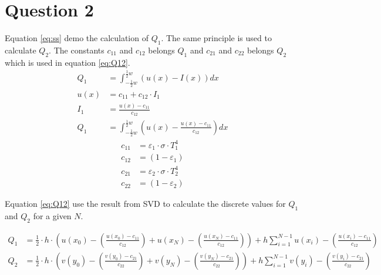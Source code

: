 \newpage
\section*{Question 2}

Equation \ref{eq:ss} demo the calculation of \( Q_1 \). The same principle is used to calculate \( Q_2 \). 
The constants \( c_{11} \) and \( c_{12} \) belongs \( Q_1 \) and \( c_{21} \) and \( c_{22} \) belongs \( Q_2 \) which is used in equation \ref{eq:Q12}.\\

\begin{equation}
\begin{align*}
Q_{ 1 }&=\int _{ -\frac { 1 }{ 2 } w }^{ \frac { 1 }{ 2 } w } \left( { u }\left( x \right) -I\left( x \right)  \right) { dx }\\ 
u\left( x \right) &={ c }_{ 11 }+{ c }_{ 12 }\cdot I_{ 1 }\\ 
{ I }_{ 1 }&=\frac { u\left( x \right) -{ c }_{ 11 } }{ { c }_{ 12 } } \\ 
Q_{ 1 }&=\int _{ -\frac { 1 }{ 2 } w }^{ \frac { 1 }{ 2 } w } \left( { u }\left( x \right) -\frac { u\left( x \right) -{ c }_{ 11 } }{ { c }_{ 12 } }  \right) { dx }
\end{align*}
\label{eq:ss}
\end{equation}
\begin{equation}
\begin{align*}
{ c }_{ 11 }&={ \varepsilon  }_{ 1 }\cdot \sigma \cdot { T }_{ 1 }^{ 4 }\\ 
{ c }_{ 12 }&=\left( 1-{ \varepsilon  }_{ 1 } \right) \\ 
{ c }_{ 21 }&={ \varepsilon  }_{ 2 }\cdot \sigma \cdot { T }_{ 2 }^{ 4 }\\ 
{ c }_{ 22 }&=\left( 1-{ \varepsilon  }_{ 2 } \right) 
\end{align*}
\label{eq:ad}
\end{equation}

Equation \ref{eq:Q12} use the result from SVD to calculate the discrete values for \( Q_1 \) and \( Q_2 \) for a given \( N \).

\begin{equation}
\begin{align*}
{ Q }_{ 1 }&=\frac { 1 }{ 2 } \cdot h\cdot \left( u\left( { x }_{ 0 } \right) -\left( \frac { u\left( { x }_{ 0 } \right) -{ c }_{ 11 } }{ { c }_{ 12 } }  \right) +u\left( { x }_{ N } \right) -\left( \frac { u\left( { x }_{ N } \right) -{ c }_{ 11 } }{ { c }_{ 12 } }  \right)  \right) +h\sum _{ i=1 }^{ N-1 }{ u\left( { x }_{ i } \right) - } \left( \frac { u\left( { x }_{ i } \right) -{ c }_{ 11 } }{ { c }_{ 12 } }  \right) \\
{ Q }_{ 2 }&=\frac { 1 }{ 2 } \cdot h\cdot \left( v\left( { y }_{ 0 } \right) -\left( \frac { v\left( { y }_{ 0 } \right) -{ c }_{ 21 } }{ { c }_{ 22 } }  \right) +v\left( { y }_{ N } \right) -\left( \frac { v\left( { y }_{ N } \right) -{ c }_{ 21 } }{ { c }_{ 22 } }  \right)  \right) +h\sum _{ i=1 }^{ N-1 }{ v\left( { y }_{ i } \right) - } \left( \frac { v\left( { y }_{ i } \right) -{ c }_{ 21 } }{ { c }_{ 22 } }  \right)  
\end{align*}
\label{eq:Q12}
\end{equation}

